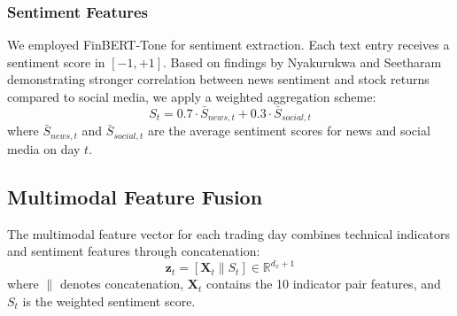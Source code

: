 \documentclass[a4paper,10pt,conference]{IEEEtran}
\begin{document}

\subsubsection{Sentiment Features}

We employed FinBERT-Tone \cite{huang2022} for sentiment extraction. Each text entry receives a sentiment score in $[-1, +1]$. Based on findings by Nyakurukwa and Seetharam \cite{nyakurukwa2024} demonstrating stronger correlation between news sentiment and stock returns compared to social media, we apply a weighted aggregation scheme:
\begin{equation}
S_{t} = 0.7 \cdot \bar{S}_{news,t} + 0.3 \cdot \bar{S}_{social,t}
\end{equation}
where $\bar{S}_{news,t}$ and $\bar{S}_{social,t}$ are the average sentiment scores for news and social media on day $t$.

\subsection{Multimodal Feature Fusion}

The multimodal feature vector for each trading day combines technical indicators and sentiment features through concatenation:
\begin{equation}
\mathbf{z}_t = [\mathbf{X}_t \| S_{t}] \in \mathbb{R}^{d_x + 1}
\end{equation}
where $\|$ denotes concatenation, $\mathbf{X}_t$ contains the 10 indicator pair features, and $S_{t}$ is the weighted sentiment score.
\end{document}
